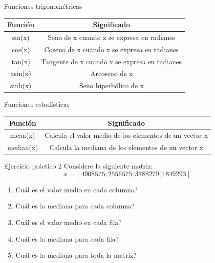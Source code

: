 \documentclass{bredelebeamer}
\begin{document}
\begin{frame}{Funciones trigonométricas}
\begin{table}[]
\centering
\begin{tabular}{|c|c|}
\hline
Función & Significado                                   \\ \hline
sin(x)  & Seno de x cuando x se expresa en radianes     \\ \hline
cos(x)  & Coseno de x cuando x se expresa en radianes   \\ \hline
tan(x)  & Tangente de x cuando x se expresa en radianes \\ \hline
asin(x) & Arcoseno de x                                 \\ \hline
sinh(x) & Seno hiperbólico de x                         \\ \hline
\end{tabular}
\end{table}
\end{frame}

\begin{frame}{Funciones estadísticas}
\begin{table}[]
\centering
\begin{tabular}{|c|c|}
\hline
Función   & Significado                                            \\ \hline
mean(x)   & Calcula el valor medio de los elementos de un vector x \\ \hline
median(x) & Calcula la mediana de los elementos de un vector x     \\ \hline
\end{tabular}
\end{table}
\end{frame}

\begin{frame}{Ejercicio práctico 2}
Considere la siguiente matriz:
\begin{equation*}
x = [4 90 85 75 ; 2 55 65 75 ; 3 78 82 79 ; 1 84 92 93]
\end{equation*}
\begin{enumerate}
\item Cuál es el valor medio en cada columna?
\item Cuál es la mediana para cada columna?
\item Cuál es el valor medio en cada fila?
\item Cuál es la mediana para cada fila?
\item Cuál es la mediana para toda la matriz?
\end{enumerate}
\end{frame}
\end{document}
